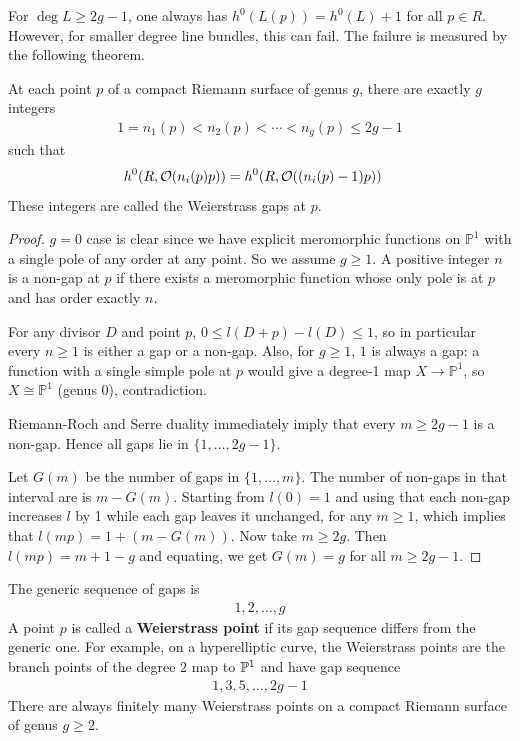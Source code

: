 \documentclass[12pt]{article}
\begin{document}
For $\deg L \geq 2g - 1$, one always has $h^0(L(p)) = h^0(L) + 1$ for all $p \in R$. However, for smaller degree line bundles, this can fail. The failure is measured by the following theorem.
\begin{theorem}
     At each point $p$ of a compact Riemann surface of genus $g$, there are exactly $g$ integers \begin{align*}
        1 = n_1(p) < n_2(p) < \cdots < n_g(p) \leq 2g - 1
    \end{align*} such that \begin{align*}
        h^0(R, \cO(n_i(p) p)) & = h^0(R, \cO((n_i(p) - 1)p))
    \end{align*} These integers are called the Weierstrass gaps at $p$.
\end{theorem}

\begin{proof}
    $g=0$ case is clear since we have explicit meromorphic functions on $\mathbb{P}^1$ with a single pole of any order at any point. So we assume $g\geq1$. A positive integer $n$ is a non-gap at $p$ if there exists a meromorphic function whose only pole is at $p$ and has order exactly $n$.
    
    For any divisor $D$ and point $p$, $0\leq l(D+p)-l(D)\leq1$, so in particular every $n\geq1$ is either a gap or a non-gap. Also, for $g\geq1$, $1$ is always a gap: a function with a single simple pole at $p$ would give a degree-1 map $X\to\mathbb{P}^1$, so $X\cong\mathbb{P}^1$ (genus 0), contradiction.

Riemann-Roch and Serre duality immediately imply that every $m\geq 2g-1$ is a non-gap. Hence all gaps lie in $\{1,\dots,2g-1\}$.

Let $G(m)$ be the number of gaps in $\{1,\dots,m\}$. The number of non-gaps in that interval are is $m-G(m)$. Starting from $l(0)=1$ and using that each non-gap increases $l$ by 1 while each gap leaves it unchanged, for any $m\geq1$, which implies that $l(mp) = 1 + (m-G(m))$. Now take $m\geq 2g$. Then $l(mp) = m+1-g$ and equating, we get $G(m) = g$ for all $m\geq 2g-1$. 
\end{proof}
The generic sequence of gaps is \begin{align*}
    1, 2, \ldots, g
\end{align*} A point $p$ is called a \textbf{Weierstrass point} if its gap sequence differs from the generic one. For example, on a hyperelliptic curve, the Weierstrass points are the branch points of the degree $2$ map to $\P^1$ and have gap sequence \begin{align*}
    1, 3, 5, \ldots, 2g - 1
\end{align*} There are always finitely many Weierstrass points on a compact Riemann surface of genus $g \geq 2$.
\end{document}
